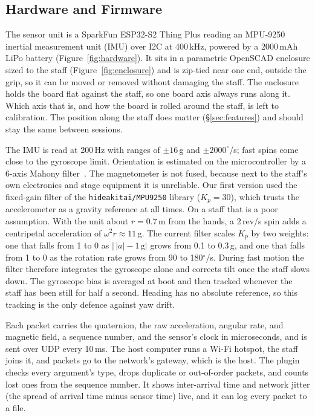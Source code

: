 \documentclass[sigconf,nonacm]{acmart}
\begin{document}
\subsection{Hardware and Firmware}
\label{sec:build}
The sensor unit is a SparkFun ESP32-S2 Thing Plus reading an MPU-9250 inertial measurement unit
(IMU) over I2C at 400\,kHz, powered by a 2000\,mAh LiPo battery (Figure~\ref{fig:hardware}). It sits
in a parametric OpenSCAD enclosure sized to the staff (Figure~\ref{fig:enclosure}) and is zip-tied
near one end, outside the grip, so it can be moved or removed without damaging the staff. The
enclosure holds the board flat against the staff, so one board axis always runs along it. Which
axis that is, and how the board is rolled around the staff, is left to calibration. The position
along the staff does matter (\S\ref{sec:features}) and should stay the same between sessions.

The IMU is read at 200\,Hz with ranges of $\pm16$\,g and $\pm2000^\circ$/s; fast spins come close to
the gyroscope limit. Orientation is estimated on the microcontroller by a 6-axis Mahony
filter~\cite{mahony2008complementary}. The magnetometer is not fused, because next to the staff's
own electronics and stage equipment it is unreliable. Our first version used the fixed-gain filter
of the \texttt{hideakitai/MPU9250} library ($K_p = 30$), which trusts the accelerometer as a gravity
reference at all times. On a staff that is a poor assumption. With the unit about $r = 0.7$\,m from
the hands, a 2\,rev/s spin adds a centripetal acceleration of $\omega^2 r \approx 11$\,g. The
current filter scales $K_p$ by two weights: one that falls from 1 to 0 as $\bigl|\,|a| - 1\,\mathrm{g}\bigr|$
grows from 0.1 to 0.3\,g, and one that falls from 1 to 0 as the rotation rate grows from 90 to
180$^\circ$/s. During fast motion the filter therefore integrates the gyroscope alone and corrects
tilt once the staff slows down. The gyroscope bias is averaged at boot and then tracked whenever the
staff has been still for half a second. Heading has no absolute reference, so this tracking is the
only defence against yaw drift.

Each packet carries the quaternion, the raw acceleration, angular rate, and magnetic field, a
sequence number, and the sensor's clock in microseconds, and is sent over UDP every 10\,ms. The
host computer runs a Wi-Fi hotspot, the staff joins it, and packets go to the network's gateway,
which is the host. The plugin checks every argument's type, drops duplicate or out-of-order packets,
and counts lost ones from the sequence number. It shows inter-arrival time and network jitter (the
spread of arrival time minus sensor time) live, and it can log every packet to a file.
\end{document}
